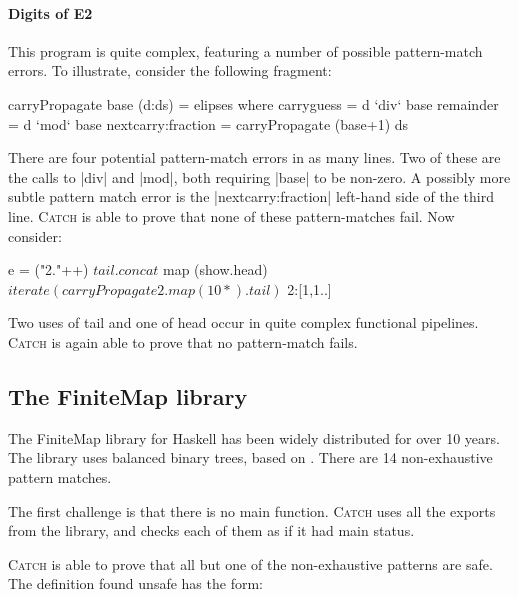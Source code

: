 \documentclass[preprint]{sigplanconf}
\newcommand{\C}[1]{\textsf{#1}}
\newcommand{\catch}{\textsc{Catch}}
\newcommand{\ignore}{}
\begin{document}
\paragraph{Digits of E2}

This program is quite complex, featuring a number of possible pattern-match errors. To illustrate, consider the following fragment:

\begin{code}
carryPropagate base (d:ds) = elipses
  where  carryguess = d `div` base
         remainder = d `mod` base
         nextcarry:fraction = carryPropagate (base+1) ds
\end{code}

\noindent There are four potential pattern-match errors in as many lines. Two of these are the calls to |div| and |mod|, both requiring \ignore|base| to be non-zero. A possibly more subtle pattern match error is the \ignore|nextcarry:fraction| left-hand side of the third line. \catch{} is able to prove that none of these pattern-matches fail. Now consider:

\begin{code}
e =  ("2."++) $
     tail . concat $
     map (show.head) $
     iterate (carryPropagate 2 . map (10*) . tail) $
     2:[1,1..]
\end{code}

\noindent Two uses of \C{tail} and one of \C{head} occur in quite complex functional pipelines. \catch{} is again able to prove that no pattern-match fails.

\subsection{The FiniteMap library}
\label{sec:finitemap}

The FiniteMap library for Haskell has been widely distributed for over 10 years. The library uses balanced binary trees, based on \citep{adams:sets}. There are 14 non-exhaustive pattern matches.

The first challenge is that there is no \C{main} function. \catch{} uses all the exports from the library, and checks each of them as if it had \C{main} status.

\catch{} is able to prove that all but one of the non-exhaustive patterns are safe. The definition found unsafe has the form:

\begin{comment}
\begin{code}
data Branch a b = Branch a b
\end{code}
\end{comment}
\end{document}
